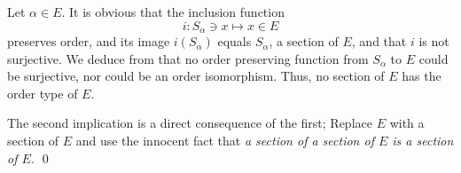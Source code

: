 \documentclass[a4paper,12pt]{article}
\begin{document}
\begin{sol}
	Let \( \alpha \in E \).
	It is obvious that the inclusion function
	\begin{equation*}
		i:S_{\alpha} \ni x \mapsto x \in E
	\end{equation*}
	preserves order, and its image \( i(S_{\alpha}) \) equals \( S_{\alpha} \),
	a section of \( E \),
	and that \( i \) is not surjective. 
	We deduce from  that no order preserving function from
	\( S_{\alpha} \) to \( E \) could be surjective, nor could be an order isomorphism.
	Thus, no section of \( E \) has the order type of \( E \).
	
	The second implication is a direct consequence of the first;
	Replace \( E \) with a section of \( E \) and use the innocent fact that
	\textit{a section of a section of \( E \) is a section of \( E \).}
	\qed\end{sol}
\end{document}
